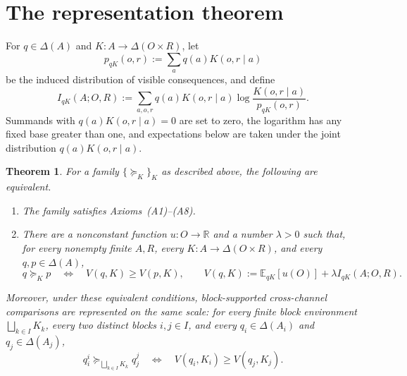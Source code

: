 \documentclass[11pt,a4paper]{article}
\newtheorem{theorem}{Theorem}
\theoremstyle{definition}
\newcommand{\D}{\Delta}
\newcommand{\E}{\mathbb E}
\newcommand{\I}{I}
\newcommand{\1}{\mathbf 1}
\begin{document}
\section{The representation theorem}\label{sec:theorem}

For $q\in\D(A)$ and $K:A\to\D(O\times R)$, let
\[
 p_{qK}(o,r):=\sum_a q(a)K(o,r\mid a)
\]
be the induced distribution of visible consequences, and define
\begin{equation}
 \I_{qK}(A;O,R)
 :=\sum_{a,o,r}q(a)K(o,r\mid a)
 \log\frac{K(o,r\mid a)}{p_{qK}(o,r)}.
 \label{eq:mi}
\end{equation}
Summands with $q(a)K(o,r\mid a)=0$ are set to zero, the logarithm has any fixed base greater than one, and expectations below are
taken under the joint distribution $q(a)K(o,r\mid a)$.

\begin{theorem}\label{thm:main}
For a family $\{\succeq_K\}_K$ as described above, the following are equivalent.
\begin{enumerate}[label=\textup{(\roman*)},leftmargin=*]
\item The family satisfies Axioms~\textup{(A1)--(A8)}.
\item There are a nonconstant function $u:O\to\mathbb R$ and a number $\lambda>0$ such that, for every nonempty
finite $A,R$, every $K:A\to\D(O\times R)$, and every $q,p\in\D(A)$,
\begin{equation}
 q\succeq_Kp
 \quad\Longleftrightarrow\quad
 V(q,K)\ge V(p,K),
 \qquad
 V(q,K):=\E_{qK}[u(O)]+\lambda\I_{qK}(A;O,R).
 \label{eq:representation}
\end{equation}
\end{enumerate}
Moreover, under these equivalent conditions, block-supported cross-channel comparisons are represented on the same
scale: for every finite block environment $\bigsqcup_{k\in I}K_k$, every two distinct blocks $i,j\in I$, and every
$q_i\in\D(A_i)$ and $q_j\in\D(A_j)$,
\[
 q_i^i\succeq_{\bigsqcup_{k\in I}K_k}q_j^j
 \quad\Longleftrightarrow\quad
 V(q_i,K_i)\ge V(q_j,K_j).
\]
\end{theorem}
\end{document}
